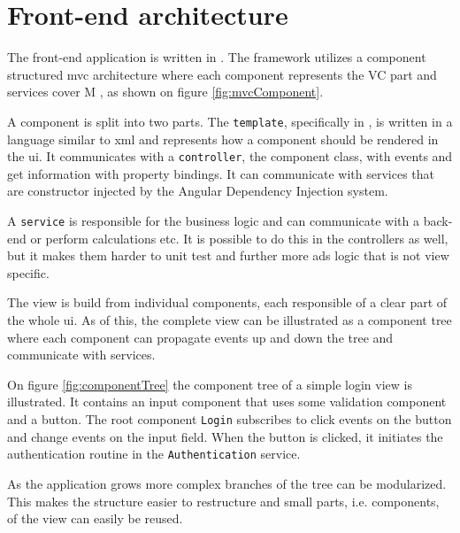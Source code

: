 \section{Front-end architecture}
The front-end application is written in .
The framework utilizes a component structured \gls{mvc} architecture where each component represents the VC part and services cover M \citep{architecture:ng}, as shown on figure \ref{fig:mvcComponent}.

A component is split into two parts.
The \verb+template+, specifically in , is written in a language similar to \gls{xml} and represents how a component should be rendered in the \gls{ui}.
It communicates with a \verb+controller+, the component class, with events and get information with property bindings.
It can communicate with services that are constructor injected by the Angular Dependency Injection system.

A \verb+service+ is responsible for the business logic and can communicate with a back-end or perform calculations etc.
It is possible to do this in the controllers as well, but it makes them harder to unit test and further more ads logic that is not view specific.


The view is build from individual components, each responsible of a clear part of the whole \gls{ui}.
As of this, the complete view can be illustrated as a component tree where each component can propagate events up and down the tree and communicate with services.

On figure \ref{fig:componentTree} the component tree of a simple login view is illustrated.
It contains an input component that uses some validation component and a button.
The root component \verb+Login+ subscribes to click events on the button and change events on the input field.
When the button is clicked, it initiates the authentication routine in the \verb+Authentication+ service.

As the application grows more complex branches of the tree can be modularized.
This makes the structure easier to restructure and small parts, i.e. components, of the view can easily be reused.







